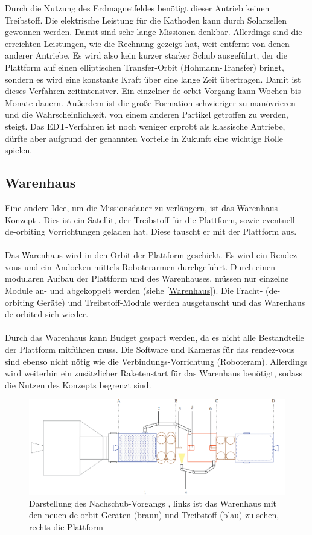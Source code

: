 \documentclass{article}
\begin{document}
Durch die Nutzung des Erdmagnetfeldes benötigt dieser Antrieb keinen Treibstoff. Die elektrische Leistung für die Kathoden kann durch Solarzellen gewonnen werden. Damit sind sehr lange Missionen denkbar. Allerdings sind die erreichten Leistungen, wie die Rechnung gezeigt hat, weit entfernt von denen anderer Antriebe. Es wird also kein kurzer starker Schub ausgeführt, der die Plattform auf einen elliptischen Transfer-Orbit (Hohmann-Transfer) bringt, sondern es wird eine konstante Kraft über eine lange Zeit übertragen. Damit ist dieses Verfahren zeitintensiver. Ein einzelner de-orbit Vorgang kann Wochen bis Monate dauern. Außerdem ist die große Formation schwieriger zu manövrieren und die Wahrscheinlichkeit, von einem anderen Partikel getroffen zu werden, steigt. Das EDT-Verfahren ist noch weniger erprobt als klassische Antriebe, dürfte aber aufgrund der genannten Vorteile in Zukunft eine wichtige Rolle spielen.

\subsection{Warenhaus}
Eine andere Idee, um die Missionsdauer zu verlängern, ist das Warenhaus-Konzept \citep{castronuovo2011active}. Dies ist ein Satellit, der Treibstoff für die Plattform, sowie eventuell de-orbiting Vorrichtungen geladen hat. Diese tauscht er mit der Plattform aus. \\\\
Das Warenhaus wird in den Orbit der Plattform geschickt. Es wird ein Rendez-vous und ein Andocken mittels Roboterarmen durchgeführt. Durch einen modularen Aufbau der Plattform und des Warenhauses, müssen nur einzelne Module an- und abgekoppelt werden (siehe \autoref{Warenhaus}). Die Fracht- (de-orbiting Geräte) und Treibstoff-Module werden ausgetauscht und das Warenhaus de-orbited sich wieder.\\\\
Durch das Warenhaus kann Budget gespart werden, da es nicht alle Bestandteile der Plattform mitführen muss. Die Software und Kameras für das rendez-vous sind ebenso nicht nötig wie die Verbindungs-Vorrichtung (Roboteram). Allerdings wird weiterhin ein zusätzlicher Raketenstart für das Warenhaus benötigt, sodass die Nutzen des Konzepts begrenzt sind.
\begin{figure}[H]
	\centering
	\includegraphics[width=\linewidth]{bilder/Warenhaus.png}
	\caption{Darstellung des Nachschub-Vorgangs \citep{castronuovo2011active}, links ist das Warenhaus mit den neuen de-orbit Geräten (braun) und Treibstoff (blau) zu sehen, rechts die Plattform}
	\label{Warenhaus}
\end{figure}
\end{document}
